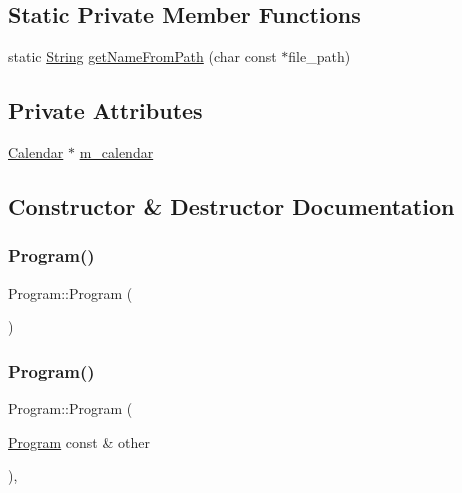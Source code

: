 \subsection*{Static Private Member Functions}
\begin{DoxyCompactItemize}
\item 
static \hyperlink{classString}{String} \hyperlink{classProgram_a5b0f8b7d9437d17ebc2e851d345f4a9b}{get\+Name\+From\+Path} (char const $\ast$file\+\_\+path)
\end{DoxyCompactItemize}
\subsection*{Private Attributes}
\begin{DoxyCompactItemize}
\item 
\hyperlink{classCalendar}{Calendar} $\ast$ \hyperlink{classProgram_a851d360e6d0aa789dc891896ea75dcbb}{m\+\_\+calendar}
\end{DoxyCompactItemize}


\subsection{Constructor \& Destructor Documentation}
\mbox{\label{classProgram_aaefaa0df08f3484476fc4d61e97acbdc}} 
\subsubsection{\texorpdfstring{Program()}{Program()}\hspace{0.1cm}{\footnotesize\ttfamily [1/2]}}
{\footnotesize\ttfamily Program\+::\+Program (\begin{DoxyParamCaption}{ }\end{DoxyParamCaption})\hspace{0.3cm}{\ttfamily [private]}}

\mbox{\label{classProgram_a9261168f1c251276a449ec0216c07650}} 
\subsubsection{\texorpdfstring{Program()}{Program()}\hspace{0.1cm}{\footnotesize\ttfamily [2/2]}}
{\footnotesize\ttfamily Program\+::\+Program (\begin{DoxyParamCaption}\item[{\hyperlink{classProgram}{Program} const \&}]{other }\end{DoxyParamCaption})\hspace{0.3cm}{\ttfamily [private]}, {\ttfamily [delete]}}

